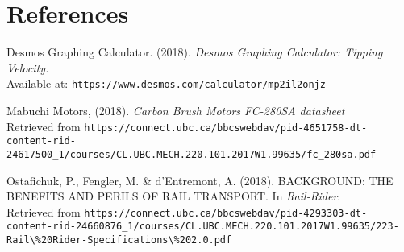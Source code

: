 \documentclass[class=../../report, crop=false]{standalone}
\begin{document}
\section{References}

\indent Desmos Graphing Calculator. (2018). \textit{Desmos Graphing Calculator: Tipping Velocity.} \\
Available at: \verb|https://www.desmos.com/calculator/mp2il2onjz|

Mabuchi Motors, (2018). \textit{Carbon Brush Motors FC-280SA datasheet} \\
Retrieved from \verb|https://connect.ubc.ca/bbcswebdav/pid-4651758-dt-content-rid-24617500_1/courses/CL.UBC.MECH.220.101.2017W1.99635/fc_280sa.pdf|

Ostafichuk, P., Fengler, M. \& d’Entremont, A. (2018). BACKGROUND: THE BENEFITS AND PERILS OF RAIL TRANSPORT. In \textit{Rail-Rider}. \\
Retrieved from \verb|https://connect.ubc.ca/bbcswebdav/pid-4293303-dt-content-rid-24660876_1/courses/CL.UBC.MECH.220.101.2017W1.99635/223-Rail\%20Rider-Specifications\%202.0.pdf|
\end{document}
